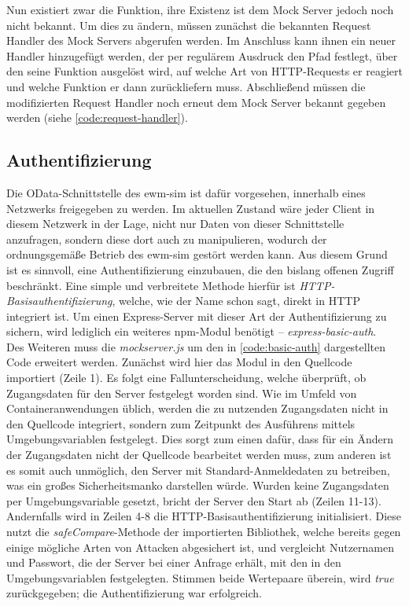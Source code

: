 Nun existiert zwar die Funktion, ihre Existenz ist dem Mock Server jedoch noch nicht bekannt.
Um dies zu ändern, müssen zunächst die bekannten Request Handler des Mock Servers abgerufen werden.
Im Anschluss kann ihnen ein neuer Handler hinzugefügt werden, der per regulärem Ausdruck den Pfad festlegt, über den seine Funktion ausgelöst wird, auf welche Art von \ac{HTTP}-Requests er reagiert und welche Funktion er dann zurückliefern muss.
Abschließend müssen die modifizierten Request Handler noch erneut dem Mock Server bekannt gegeben werden (siehe \autoref{code:request-handler}).




\subsection{Authentifizierung}
Die \ac{OData}-Schnittstelle des \ac{ewm-sim} ist dafür vorgesehen, innerhalb eines Netzwerks freigegeben zu werden.
Im aktuellen Zustand wäre jeder Client in diesem Netzwerk in der Lage, nicht nur Daten von dieser Schnittstelle anzufragen, sondern diese dort auch zu manipulieren, wodurch der ordnungsgemäße Betrieb des \ac{ewm-sim} gestört werden kann.
Aus diesem Grund ist es sinnvoll, eine Authentifizierung einzubauen, die den bislang offenen Zugriff beschränkt.
Eine simple und verbreitete Methode hierfür ist \emph{\ac{HTTP}-Basisauthentifizierung}, welche, wie der Name schon sagt, direkt in \ac{HTTP} integriert ist.
Um einen Express-Server mit dieser Art der Authentifizierung zu sichern, wird lediglich ein weiteres \ac{npm}-Modul benötigt -- \emph{express-basic-auth}.~\cite{auth-npm, auth-tutorial}
Des Weiteren muss die \emph{mockserver.js} um den in \autoref{code:basic-auth} dargestellten Code erweitert werden.
Zunächst wird hier das Modul in den Quellcode importiert (Zeile 1).
Es folgt eine Fallunterscheidung, welche überprüft, ob Zugangsdaten für den Server festgelegt worden sind.
Wie im Umfeld von Containeranwendungen üblich, werden die zu nutzenden Zugangsdaten nicht in den Quellcode integriert, sondern zum Zeitpunkt des Ausführens mittels Umgebungsvariablen festgelegt.
Dies sorgt zum einen dafür, dass für ein Ändern der Zugangsdaten nicht der Quellcode bearbeitet werden muss, zum anderen ist es somit auch unmöglich, den Server mit Standard-Anmeldedaten zu betreiben, was ein großes Sicherheitsmanko darstellen würde.
Wurden keine Zugangsdaten per Umgebungsvariable gesetzt, bricht der Server den Start ab (Zeilen 11-13).
Andernfalls wird in Zeilen 4-8 die \ac{HTTP}-Basisauthentifizierung initialisiert.
Diese nutzt die \emph{safeCompare}-Methode der importierten Bibliothek, welche bereits gegen einige mögliche Arten von Attacken abgesichert ist, und vergleicht Nutzernamen und Passwort, die der Server bei einer Anfrage erhält, mit den in den Umgebungsvariablen festgelegten.
Stimmen beide Wertepaare überein, wird \emph{true} zurückgegeben; die Authentifizierung war erfolgreich.

